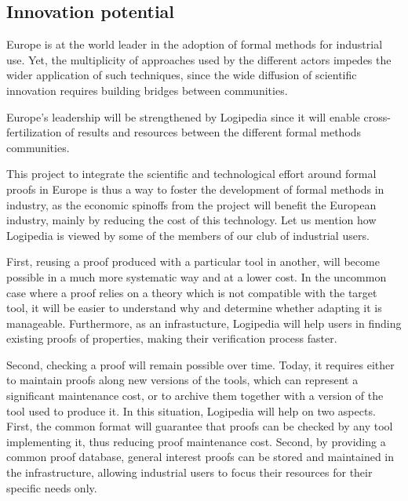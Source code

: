\subsection*{Innovation potential}

Europe is at the world leader in the adoption of formal methods for
industrial use. Yet, the multiplicity of approaches used by the
different actors impedes the wider application of such techniques,
since the wide diffusion of scientific innovation requires building
bridges between communities.

Europe's leadership will be strengthened by Logipedia since it will
enable cross-fertilization of results and resources between the
different formal methods communities.

This project to integrate the scientific and technological effort
around formal proofs in Europe is thus a way to foster the development
of formal methods in industry, as the economic spinoffs from the
project will benefit the European industry, mainly by reducing the
cost of this technology. Let us mention how Logipedia is viewed by
some of the members of our club of industrial users.

First, reusing a proof produced with a particular tool in another, 
will become possible in a much more systematic way and at a
lower cost. In the uncommon case where a proof relies on a theory
which is not compatible with the target tool, it will be easier to
understand why and determine whether adapting it is manageable.
Furthermore, as an infrastucture, Logipedia will help users
in finding existing proofs of properties, making their verification
process faster.

Second, checking a proof will remain possible over time. Today, it
requires either to maintain proofs along new versions of the tools,
which can represent a significant maintenance cost, or to archive
them together with a version of the tool used to produce it. In this
situation, Logipedia will help on two aspects. First, the
common format will guarantee that proofs can be checked by any tool
implementing it, thus reducing proof maintenance cost. Second, by
providing a common proof database, general interest proofs can be
stored and maintained in the infrastructure, allowing industrial users
to focus their resources for their specific needs only.

